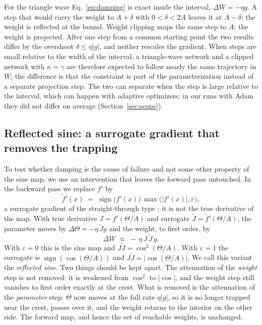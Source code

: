 \documentclass[11pt,a4paper]{article}
\begin{document}
For the triangle wave Eq.~\eqref{eq:damping} is exact inside the interval, $\Delta W=-\eta g$. A step
that would carry the weight to $A+\delta$ with $0<\delta<2A$ leaves it at $A-\delta$: the weight is reflected at
the bound. Weight clipping \citep{elsayed2024weight} maps the same step to $A$: the weight is projected.
After one step from a common starting point the two results differ by the overshoot $\delta\le\eta|g|$, and
neither rescales the gradient. When steps are small relative to the width of the interval, a triangle-wave
network and a clipped network with $\kappa=\gamma$ are therefore expected to follow nearly the same
trajectory in $W$; the difference is that the constraint is part of the parameterization instead of a
separate projection step. The two can separate when the step is large relative to the interval, which can
happen with adaptive optimizers; in our runs with Adam they did not differ on average
(Section~\ref{sec:scope}).

\subsection{Reflected sine: a surrogate gradient that removes the trapping}\label{sec:floor}

To test whether damping is the cause of failure and not some other property of the sine map, we use an
intervention that leaves the forward pass untouched. In the backward pass we replace $f'$ by
\begin{equation}
  \tilde f'(x) \;=\; \operatorname{sign}\!\big(f'(x)\big)\,\max\!\big(|f'(x)|,\varepsilon\big), \label{eq:floor}
\end{equation}
a surrogate gradient of the straight-through type \citep{bengio2013estimating,yin2019understanding}; it is
not the true derivative of the map. With true derivative $J=f'(\Theta/A)$ and surrogate $\tilde J=\tilde
f'(\Theta/A)$, the parameter moves by $\Delta\Theta=-\eta\,\tilde J g$ and the weight, to first order, by
\begin{equation}
  \Delta W \;\approx\; -\,\eta\, J\,\tilde J\, g . \label{eq:surrogate}
\end{equation}
With $\varepsilon=0$ this is the sine map and $J\tilde J=\cos^2(\Theta/A)$. With $\varepsilon=1$ the surrogate
is $\operatorname{sign}(\cos(\Theta/A))$ and $J\tilde J=|\cos(\Theta/A)|$. We call this variant the
\emph{reflected sine}. Two things should be kept apart. The attenuation of the \emph{weight} step is not
removed: it is weakened from $\cos^2$ to $|\cos|$, and the weight step still vanishes to first order exactly
at the crest. What is removed is the attenuation of the \emph{parameter} step: $\Theta$ now moves at the full
rate $\eta|g|$, so it is no longer trapped near the crest, passes over it, and the weight returns to the
interior on the other side. The forward map, and hence the set of reachable weights, is unchanged.
\end{document}
